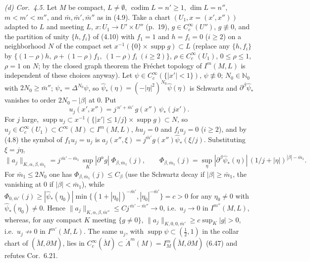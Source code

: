 \documentclass[11pt]{article}
\newcommand{\N}{\mathbb{N}}
\newcommand{\supp}{\operatorname{supp}}
\newcommand{\Mo}{\mathring{M}}
\newcommand{\Mb}{\breve{M}}
\begin{document}
\emph{(d) Cor.~4.5.} Let $M$ be compact, $L\ne\emptyset$, $\operatorname{codim}L=n'\ge1$, $\dim L=n''$, $m<m'<m''$, and $\bar m,\bar m',\bar m''$ as in (4.9). Take a chart $(U_1,x=(x',x''))$ adapted to $L$ and meeting $L$, $x\colon U_1\to U'\times U''$ (p.~19), $g\in C_c^\infty(U'')$, $g\not\equiv0$, and the partition of unity $\{h,f_i\}$ of (4.10) with $f_1=1$ and $h=f_i=0$ ($i\ge2$) on a neighborhood $N$ of the compact set $x^{-1}(\{0\}\times\supp g)\subset L$ (replace any $\{h,f_i\}$ by $\{(1-\rho)h,\ \rho+(1-\rho)f_1,\ (1-\rho)f_i\ (i\ge2)\}$, $\rho\in C_c^\infty(U_1)$, $0\le\rho\le1$, $\rho=1$ on $N$; by the closed graph theorem the Fr\'echet topology of $I^m(M,L)$ is independent of these choices anyway). Let $\psi\in C_c^\infty(\{|x'|<1\})$, $\psi\not\equiv0$; $N_0\in\N_0$ with $2N_0\ge\bar m''$; $\psi_*=\Delta^{N_0}\psi$, so $\hat\psi_*(\eta)=(-|\eta|^2)^{N_0}\hat\psi(\eta)$ is Schwartz and $\partial^\beta\hat\psi_*$ vanishes to order $2N_0-|\beta|$ at $0$. Put
\[
u_j(x',x'')=j^{\,n'+\bar m'}\,g(x'')\,\psi_*(jx').
\]
For $j$ large, $\supp u_j\subset x^{-1}(\{|x'|\le1/j\}\times\supp g)\subset N$, so $u_j\in C_c^\infty(U_1)\subset C^\infty(M)\subset I^{m}(M,L)$, $hu_j=0$ and $f_iu_j=0$ ($i\ge2$), and by (4.8) the symbol of $f_1u_j=u_j$ is $a_j(x'',\xi)=j^{\bar m'}g(x'')\hat\psi_*(\xi/j)$. Substituting $\xi=j\eta$,
\[
\|a_j\|_{K,\alpha,\beta,\bar m_1}=j^{\,\bar m'-\bar m_1}\,\sup_K|\partial^\alpha g|\;\Phi_{\beta,\bar m_1}(j),\qquad
\Phi_{\beta,\bar m_1}(j)=\sup_\eta|\partial^\beta\hat\psi_*(\eta)|\,(1/j+|\eta|)^{|\beta|-\bar m_1}.
\]
For $\bar m_1\le2N_0$ one has $\Phi_{\beta,\bar m_1}(j)\le C_\beta$ (use the Schwartz decay if $|\beta|\ge\bar m_1$, the vanishing at $0$ if $|\beta|<\bar m_1$), while $\Phi_{0,\bar m'}(j)\ge|\hat\psi_*(\eta_0)|\min\{(1+|\eta_0|)^{-\bar m'},|\eta_0|^{-\bar m'}\}=c>0$ for any $\eta_0\ne0$ with $\hat\psi_*(\eta_0)\ne0$. Hence $\|a_j\|_{K,\alpha,\beta,\bar m''}\le Cj^{\,\bar m'-\bar m''}\to0$, i.e.\ $u_j\to0$ in $I^{m''}(M,L)$, whereas, for any compact $K$ meeting $\{g\ne0\}$, $\|a_j\|_{K,0,0,\bar m'}\ge c\sup_K|g|>0$, i.e.\ $u_j\not\to0$ in $I^{m'}(M,L)$. The same $u_j$, with $\supp\psi\subset(\tfrac12,1)$ in the collar chart of $(\Mb,\partial M)$, lies in $C_c^\infty(\Mo)\subset\dot A^{m}(M)=I^m_M(\Mb,\partial M)$ (6.47) and refutes Cor.~6.21.
\end{document}
